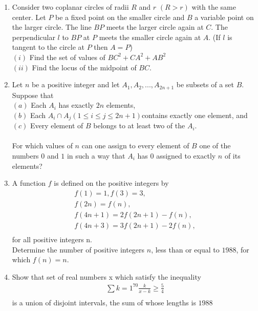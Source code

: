 \documentclass[12pt,-letter paper]{article}
\providecommand{\brak}[1]{\ensuremath{\left(#1\right)}}
\begin{document}
\begin{enumerate}
 
	\item Consider two coplanar circles of radii $R$ and $r$ $\brak{R > r}$ with the same center. Let $P$ be a fixed point on the smaller circle and $B$ a variable point on the larger circle. The line $BP$ meets the larger circle again at $C$. The perpendicular $l$ to $BP$ at $P$ meets the smaller circle again at $A$. (If $l$ is tangent to the circle at $P$ then $A = P$)\\
		\brak{i} Find the set of values of $BC^2+CA^2+AB^2$ \\
		\brak{ii} Find the locus of the midpoint of $BC$.
		
	\item Let $n$ be a positive integer and let $A_1, A_2, . . . , A_{2n+1}$ be subsets of a set $B$. Suppose that \\
		\brak{a} Each $A_i$ has exactly $2n$ elements,\\ 
		\brak{b} Each $A_i \cap A_j \brak{1\leq i \leq j\leq 2n+1}$contains exactly one element, and \\
		\brak{c} Every element of $B$ belongs to at least two of the $A_i$.\\
		\\
		For which values of $n$ can one assign to every element of $B$ one of the numbers $0$ and $1$ in such a way that $A_i$ has $0$ assigned to exactly $n$ of its elements?

	\item A function $f$ is defined on the positive integers by\\ 
		\begin{align*}	
f\brak{1}=1, f\brak{3}=3, \\
f\brak{2n}=f\brak{n}, \\
		f\brak{4n+1}=2f\brak{2n+1}-f\brak{n},\\
		f\brak{4n+3}=3f\brak{2n+1}-2f\brak{n},\\ \end{align*}
		for all positive integers n.\\
		Determine the number of positive integers $n$, less than or equal to $1988$, for which $f(n) = n$.

	\item Show that set of real numbers x which satisfy the inequality \\
		\begin{align*}\sum{k=1}^{70}\frac{k}{x-k}\geq \frac{5}{4}\\ \end{align*}
		is a union of disjoint intervals, the sum of whose lengths is $1988$


\end{enumerate}
\end{document}
